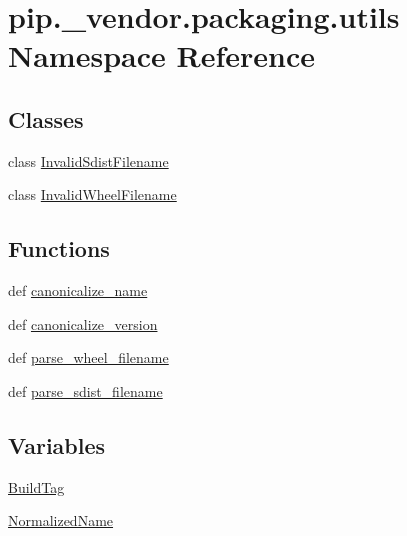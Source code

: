 \hypertarget{namespacepip_1_1__vendor_1_1packaging_1_1utils}{}\section{pip.\+\_\+vendor.\+packaging.\+utils Namespace Reference}
\label{namespacepip_1_1__vendor_1_1packaging_1_1utils}
\subsection*{Classes}
\begin{DoxyCompactItemize}
\item 
class \hyperlink{classpip_1_1__vendor_1_1packaging_1_1utils_1_1InvalidSdistFilename}{Invalid\+Sdist\+Filename}
\item 
class \hyperlink{classpip_1_1__vendor_1_1packaging_1_1utils_1_1InvalidWheelFilename}{Invalid\+Wheel\+Filename}
\end{DoxyCompactItemize}
\subsection*{Functions}
\begin{DoxyCompactItemize}
\item 
def \hyperlink{namespacepip_1_1__vendor_1_1packaging_1_1utils_a955c44127cb7736fd75bb002bfb4790d}{canonicalize\+\_\+name}
\item 
def \hyperlink{namespacepip_1_1__vendor_1_1packaging_1_1utils_abb2209b23937515de298e84c2e4cb260}{canonicalize\+\_\+version}
\item 
def \hyperlink{namespacepip_1_1__vendor_1_1packaging_1_1utils_a3b768ead1373417782777747747634c2}{parse\+\_\+wheel\+\_\+filename}
\item 
def \hyperlink{namespacepip_1_1__vendor_1_1packaging_1_1utils_a0a5e4b3a5e7076d2b7fb92c913bf09a5}{parse\+\_\+sdist\+\_\+filename}
\end{DoxyCompactItemize}
\subsection*{Variables}
\begin{DoxyCompactItemize}
\item 
\hyperlink{namespacepip_1_1__vendor_1_1packaging_1_1utils_aeba176957c57b09588f0e122ff9d788e}{Build\+Tag}
\item 
\hyperlink{namespacepip_1_1__vendor_1_1packaging_1_1utils_a99f8a8271f0c706777823a1671f4a418}{Normalized\+Name}
\end{DoxyCompactItemize}


